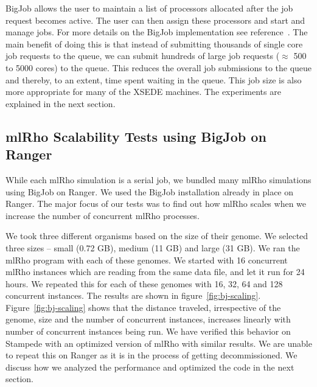 \documentclass{sig-alternate}
\begin{document}
BigJob allows the user to maintain a list of processors allocated after the job request becomes active. The user can then assign these processors and start and manage jobs. For more details on the BigJob implementation see reference~\cite{saga_bigjob_condor_cloud}. The main benefit of doing this is that instead of submitting thousands of single core job requests to the queue, we can submit hundreds of large job requests ($\approx$ 500 to 5000 cores) to the queue. This reduces the overall job submissions to the queue and thereby, to an extent, time spent waiting in the queue. This job size is also more appropriate for many of the XSEDE machines. The experiments are explained in the next section. 


\subsection{mlRho Scalability Tests using BigJob on Ranger }
\label{sec:tests}

While each mlRho simulation is a serial job, we bundled many mlRho simulations using BigJob on Ranger. 
We used the BigJob installation already in place on Ranger. The major focus of our tests was to find out how mlRho scales when we increase the number of concurrent mlRho processes. 

We took three different organisms based on the size of their genome. We selected three sizes -- small (0.72 GB), medium (11 GB) and large (31 GB). We ran the mlRho program with each of these genomes. We started with 16 concurrent mlRho instances which are reading from the same data file, and let it run for 24 hours. We repeated this for each of these genomes with 16, 32, 64 and 128 concurrent instances. The results are shown in figure~\ref{fig:bj-scaling}.
Figure~\ref{fig:bj-scaling} shows that the distance traveled, irrespective of the genome, size and the number of concurrent instances, increases linearly with number of concurrent instances being run. We have verified this behavior on Stampede with an optimized version of mlRho with similar results. We are unable to repeat this on Ranger as it is in the process of getting decommissioned. We discuss how we analyzed the performance and optimized the code in the next section. 
\end{document}
